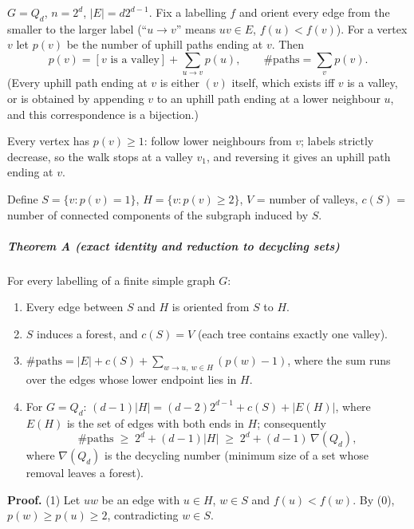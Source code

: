 \documentclass[11pt,a4paper]{article}
\providecommand{\tightlist}{\setlength{\itemsep}{0pt}\setlength{\parskip}{0pt}}
\begin{document}
\(G=Q_d\), \(n=2^d\), \(|E|=d2^{d-1}\). Fix a labelling \(f\) and orient
every edge from the smaller to the larger label (``\(u\to v\)'' means
\(uv\in E\), \(f(u)<f(v)\)). For a vertex \(v\) let \(p(v)\) be the
number of uphill paths ending at \(v\). Then
\[p(v)=[v\text{ is a valley}]+\sum_{u\to v}p(u),\qquad \#\text{paths}=\sum_v p(v). \tag{0}\]
(Every uphill path ending at \(v\) is either \((v)\) itself, which
exists iff \(v\) is a valley, or is obtained by appending \(v\) to an
uphill path ending at a lower neighbour \(u\), and this correspondence
is a bijection.)

Every vertex has \(p(v)\ge 1\): follow lower neighbours from \(v\);
labels strictly decrease, so the walk stops at a valley \(v_1\), and
reversing it gives an uphill path ending at \(v\).

Define \(S=\{v:p(v)=1\}\), \(H=\{v:p(v)\ge 2\}\), \(V\) = number of
valleys, \(c(S)\) = number of connected components of the subgraph
induced by \(S\).

\subparagraph{Theorem A (exact identity and reduction to decycling
sets)}\label{theorem-a-exact-identity-and-reduction-to-decycling-sets}

For every labelling of a finite simple graph \(G\):

\begin{enumerate}
\def\labelenumi{\arabic{enumi}.}
\tightlist
\item
  Every edge between \(S\) and \(H\) is oriented from \(S\) to \(H\).
\item
  \(S\) induces a forest, and \(c(S)=V\) (each tree contains exactly one
  valley).
\item
  \(\#\text{paths}=|E|+c(S)+\sum_{w\to u,\ w\in H}(p(w)-1)\), where the
  sum runs over the edges whose lower endpoint lies in \(H\).
\item
  For \(G=Q_d\): \((d-1)|H|=(d-2)2^{d-1}+c(S)+|E(H)|\), where \(E(H)\)
  is the set of edges with both ends in \(H\); consequently
  \[\#\text{paths}\;\ge\;2^d+(d-1)|H|\;\ge\;2^d+(d-1)\,\nabla(Q_d),\]
  where \(\nabla(Q_d)\) is the decycling number (minimum size of a set
  whose removal leaves a forest).
\end{enumerate}

\textbf{Proof.} (1) Let \(uw\) be an edge with \(u\in H\), \(w\in S\)
and \(f(u)<f(w)\). By (0), \(p(w)\ge p(u)\ge 2\), contradicting
\(w\in S\).
\end{document}
